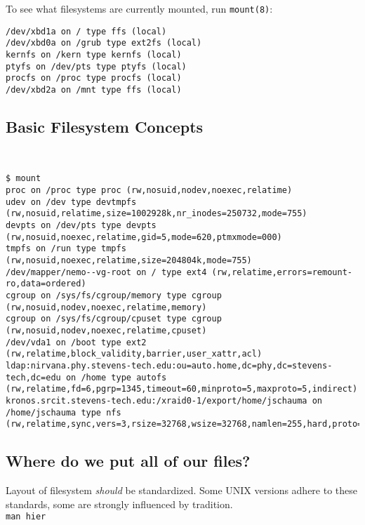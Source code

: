 \documentclass[xga]{xdvislides}
\begin{document}
To see what filesystems are currently mounted, run \verb+mount(8)+:
\\

\begin{verbatim}
/dev/xbd1a on / type ffs (local)
/dev/xbd0a on /grub type ext2fs (local)
kernfs on /kern type kernfs (local)
ptyfs on /dev/pts type ptyfs (local)
procfs on /proc type procfs (local)
/dev/xbd2a on /mnt type ffs (local)
\end{verbatim}


\subsection{Basic Filesystem Concepts}
\\

\begin{verbatim}
$ mount
proc on /proc type proc (rw,nosuid,nodev,noexec,relatime)
udev on /dev type devtmpfs (rw,nosuid,relatime,size=1002928k,nr_inodes=250732,mode=755)
devpts on /dev/pts type devpts (rw,nosuid,noexec,relatime,gid=5,mode=620,ptmxmode=000)
tmpfs on /run type tmpfs (rw,nosuid,noexec,relatime,size=204804k,mode=755)
/dev/mapper/nemo--vg-root on / type ext4 (rw,relatime,errors=remount-ro,data=ordered)
cgroup on /sys/fs/cgroup/memory type cgroup (rw,nosuid,nodev,noexec,relatime,memory)
cgroup on /sys/fs/cgroup/cpuset type cgroup (rw,nosuid,nodev,noexec,relatime,cpuset)
/dev/vda1 on /boot type ext2 (rw,relatime,block_validity,barrier,user_xattr,acl)
ldap:nirvana.phy.stevens-tech.edu:ou=auto.home,dc=phy,dc=stevens-tech,dc=edu on /home type autofs (rw,relatime,fd=6,pgrp=1345,timeout=60,minproto=5,maxproto=5,indirect)
kronos.srcit.stevens-tech.edu:/xraid0-1/export/home/jschauma on /home/jschauma type nfs (rw,relatime,sync,vers=3,rsize=32768,wsize=32768,namlen=255,hard,proto=tcp,timeo=600,retrans=2,sec=sys,mountaddr=155.246.89.203,mountvers=3,mountport=53643,mountproto=udp,local_lock=none,addr=155.246.89.203)
\end{verbatim}

\subsection{Where do we put all of our files?}
Layout of filesystem {\em should} be standardized.  Some UNIX versions adhere
to these standards, some are strongly influenced by tradition.
\\

{\tt man hier}
\end{document}
